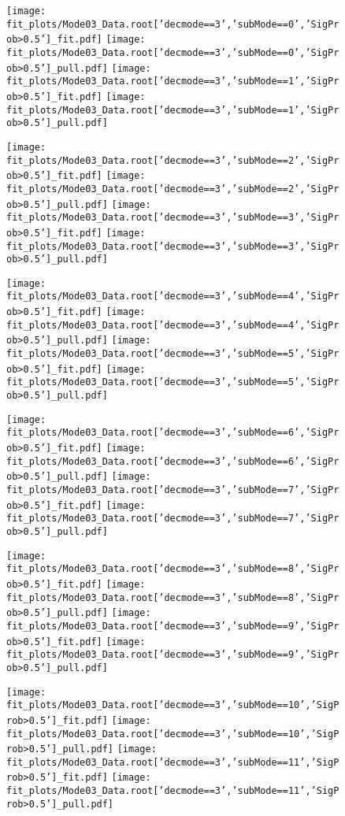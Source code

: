 \begin{figure}[p!]
\begin{center}
\texttt{[image: fit\_plots/Mode03\_Data.root['decmode==3','subMode==0','SigProb>0.5']\_fit.pdf]}
\texttt{[image: fit\_plots/Mode03\_Data.root['decmode==3','subMode==0','SigProb>0.5']\_pull.pdf]}
\texttt{[image: fit\_plots/Mode03\_Data.root['decmode==3','subMode==1','SigProb>0.5']\_fit.pdf]}
\texttt{[image: fit\_plots/Mode03\_Data.root['decmode==3','subMode==1','SigProb>0.5']\_pull.pdf]}

\texttt{[image: fit\_plots/Mode03\_Data.root['decmode==3','subMode==2','SigProb>0.5']\_fit.pdf]}
\texttt{[image: fit\_plots/Mode03\_Data.root['decmode==3','subMode==2','SigProb>0.5']\_pull.pdf]}
\texttt{[image: fit\_plots/Mode03\_Data.root['decmode==3','subMode==3','SigProb>0.5']\_fit.pdf]}
\texttt{[image: fit\_plots/Mode03\_Data.root['decmode==3','subMode==3','SigProb>0.5']\_pull.pdf]}

\texttt{[image: fit\_plots/Mode03\_Data.root['decmode==3','subMode==4','SigProb>0.5']\_fit.pdf]}
\texttt{[image: fit\_plots/Mode03\_Data.root['decmode==3','subMode==4','SigProb>0.5']\_pull.pdf]}
\texttt{[image: fit\_plots/Mode03\_Data.root['decmode==3','subMode==5','SigProb>0.5']\_fit.pdf]}
\texttt{[image: fit\_plots/Mode03\_Data.root['decmode==3','subMode==5','SigProb>0.5']\_pull.pdf]}

\texttt{[image: fit\_plots/Mode03\_Data.root['decmode==3','subMode==6','SigProb>0.5']\_fit.pdf]}
\texttt{[image: fit\_plots/Mode03\_Data.root['decmode==3','subMode==6','SigProb>0.5']\_pull.pdf]}
\texttt{[image: fit\_plots/Mode03\_Data.root['decmode==3','subMode==7','SigProb>0.5']\_fit.pdf]}
\texttt{[image: fit\_plots/Mode03\_Data.root['decmode==3','subMode==7','SigProb>0.5']\_pull.pdf]}

\texttt{[image: fit\_plots/Mode03\_Data.root['decmode==3','subMode==8','SigProb>0.5']\_fit.pdf]}
\texttt{[image: fit\_plots/Mode03\_Data.root['decmode==3','subMode==8','SigProb>0.5']\_pull.pdf]}
\texttt{[image: fit\_plots/Mode03\_Data.root['decmode==3','subMode==9','SigProb>0.5']\_fit.pdf]}
\texttt{[image: fit\_plots/Mode03\_Data.root['decmode==3','subMode==9','SigProb>0.5']\_pull.pdf]}

\texttt{[image: fit\_plots/Mode03\_Data.root['decmode==3','subMode==10','SigProb>0.5']\_fit.pdf]}
\texttt{[image: fit\_plots/Mode03\_Data.root['decmode==3','subMode==10','SigProb>0.5']\_pull.pdf]}
\texttt{[image: fit\_plots/Mode03\_Data.root['decmode==3','subMode==11','SigProb>0.5']\_fit.pdf]}
\texttt{[image: fit\_plots/Mode03\_Data.root['decmode==3','subMode==11','SigProb>0.5']\_pull.pdf]}


\end{center}
\end{figure}
